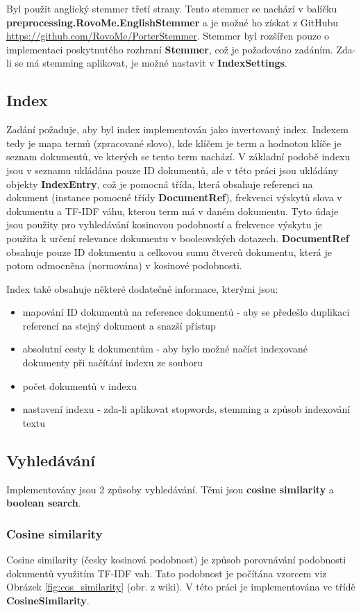 \documentclass[12pt, letterpaper]{article}
\begin{document}
Byl použit anglický stemmer třetí strany. Tento stemmer se nachází v balíčku
\textbf{preprocessing.RovoMe.EnglishStemmer} a je možné ho získat z GitHubu
\url{https://github.com/RovoMe/PorterStemmer}. Stemmer byl rozšířen pouze o implementaci poskytnutého rozhraní
\textbf{Stemmer}, což je požadováno zadáním. Zda-li se má stemming aplikovat, je možné nastavit v
\textbf{IndexSettings}.
%
%
\subsection{Index}
Zadání požaduje, aby byl index implementován jako invertovaný index. Indexem tedy je mapa termů (zpracované slovo), kde
klíčem je term a hodnotou klíče je seznam dokumentů, ve kterých se tento term nachází. V základní podobě indexu jsou
v seznamu ukládána pouze ID dokumentů, ale v této práci jsou ukládány objekty \textbf{IndexEntry}, což je pomocná třída,
která obsahuje referenci na dokument (instance pomocné třídy \textbf{DocumentRef}), frekvenci výskytů slova v dokumentu
a TF-IDF váhu, kterou term má v daném dokumentu. Tyto údaje jsou použity pro vyhledávání kosinovou podobností a
frekvence výskytu je použita k určení relevance dokumentu v booleovských dotazech. \textbf{DocumentRef} obsahuje
pouze ID dokumentu a celkovou sumu čtverců dokumentu, která je potom odmocněna (normována) v kosinové podobnosti.

Index také obsahuje některé dodatečné informace, kterými jsou:
\begin{itemize}
    \item mapování ID dokumentů na reference dokumentů - aby se předešlo duplikaci referencí na stejný dokument a
        snazší přístup
    \item absolutní cesty k dokumentům - aby bylo možné načíst indexované dokumenty při načítání indexu ze souboru
    \item počet dokumentů v indexu
    \item nastavení indexu - zda-li aplikovat stopwords, stemming a způsob indexování textu
\end{itemize}
%
%
\subsection{Vyhledávání}
Implementovány jsou 2 způsoby vyhledávání. Těmi jsou \textbf{cosine similarity} a \textbf{boolean search}.
%
\subsubsection{Cosine similarity}
Cosine similarity (česky kosinová podobnost) je způsob porovnávání podobnosti dokumentů využitím TF-IDF vah. Tato
podobnost je počítána vzorcem viz Obrázek \ref{fig:cos_similarity} (obr. z wiki). V této práci je implementována ve
třídě \textbf{CosineSimilarity}.
\end{document}
